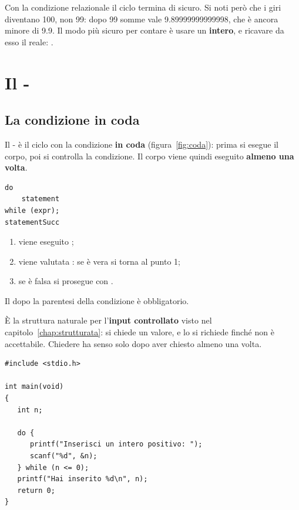 Con la condizione relazionale  il ciclo termina di sicuro. Si
noti però che i giri diventano 100, non 99: dopo 99 somme  vale
9.89999999999998, che è ancora minore di 9.9. Il modo più sicuro per contare
è usare un \textbf{intero}, e ricavare da esso il reale:
.

\section{Il -}

\subsection{La condizione in coda}

Il - è il ciclo con la condizione \textbf{in coda}
(figura~\ref{fig:coda}): prima si esegue il corpo, poi si controlla la
condizione. Il corpo viene quindi eseguito \textbf{almeno una volta}.

\begin{affianco}[0.42][c]
\begin{lstlisting}[style=c]
do
    statement
while (expr);
statementSucc
\end{lstlisting}
\risultato
\begin{enumerate}
  \item viene eseguito ;
  \item viene valutata : se è vera si torna al punto 1;
  \item se è falsa si prosegue con .
\end{enumerate}
Il \code{;} dopo la parentesi della condizione è obbligatorio.
\end{affianco}

È la struttura naturale per l'\textbf{input controllato} visto nel
capitolo~\ref{chap:strutturata}: si chiede un valore, e lo si richiede
finché non è accettabile. Chiedere ha senso solo dopo aver chiesto almeno una
volta.

\begin{affianco}[0.5][c]
\begin{lstlisting}[style=c, name=positivo.c]
#include <stdio.h>

int main(void)
{
   int n;

   do {
      printf("Inserisci un intero positivo: ");
      scanf("%d", &n);
   } while (n <= 0);
   printf("Hai inserito %d\n", n);
   return 0;
}
\end{lstlisting}
\risultato
{}
\end{affianco}

